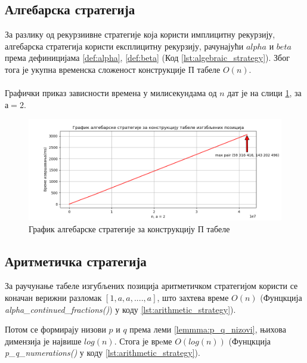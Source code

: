 \documentclass[a4paper]{article}
\begin{document}
\subsection{Алгебарска стратегија}

За разлику од рекурзиивне стратегије која користи имплицитну рекурзију, алгебарска стратегија користи експлицитну рекурзију, рачунајући $ alpha $ и $ beta $ према дефиницијама \eqref{def:alpha}, \eqref{def:beta} (Код \ref{lst:algebraic_strategy}). Због тога је укупна временска сложеност конструкције П табеле $ O(n) $.\\



\leavevmode\\
Графички приказ зависности времена у милисекундама од $ n $ дат је на слици \ref{fig:algebraic}, за $ а = 2 $.

\begin{figure}[H]
	\begin{center}
		\includegraphics[width=\textwidth]{algebraic.png}
	\end{center}
	\caption{График алгебарске стратегије за конструкцију П табеле}
	\label{fig:algebraic}
\end{figure}

\subsection{Аритметичка стратегија}

За раучунање табеле изгубљених позиција аритметичком стратегијом користи се коначан верижни разломак $ [1, a, a, ...., a] $, што захтева време $ O(n) $ (Фунцкција \textit{alpha\_continued\_fractions()}) у коду \ref{lst:arithmetic_strategy}).

Потом се формирају низови $ p $ и $ q $ према леми \ref{lemmma:p_q_nizovi}, њихова димензија је највише $ log(n) $. Стога је врeме $ O(log(n)) $ (Фунцкција \textit{p\_q\_numerations()} у коду \ref{lst:arithmetic_strategy}).
\end{document}
